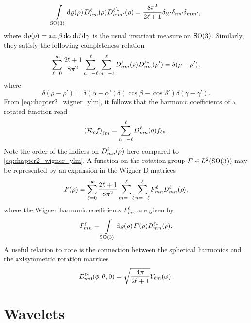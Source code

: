 %
\begin{equation}
	\integrateRotation{\rho} \wigner{\ell}{n}{m}(\rho) \wigner[\ast]{\ell'}{n'}{m'}(\rho)
	= \frac{8\pi^{2}}{2\ell+1} \delta_{\ell\ell'} \delta_{n n'} \delta_{mm'},
\end{equation}
%
where \(\rotationVolume = \sin{\beta}\dd{\alpha}\dd{\beta}\dd{\gamma}\) is the usual invariant measure on \(\rotationGroup{}\).
Similarly, they satisfy the following completeness relation
%
\begin{equation}
	\sum\limits_{\ell=0}^{\infty} \frac{2\ell+1}{8\pi^{2}} \wignerSum \sum\limits_{m=-\ell}^{\ell} \wigner{\ell}{n}{m}(\rho) \wigner[\ast]{\ell}{n}{m}(\rho')
	= \delta(\rho-\rho'),
\end{equation}
%
where
%
\begin{equation}
	\delta(\rho-\rho')
	= \delta(\alpha-\alpha') \delta(\cos{\beta} - \cos{\beta'}) \delta(\gamma-\gamma').
\end{equation}
%
From \cref{eq:chapter2_wigner_ylm}, it follows that the harmonic coefficients of a rotated function read
%
\begin{equation}
	\harmonic{(\rotation{\rho}f)}
	= \wignerSum \wigner{\ell}{m}{n}(\rho) f_{\ell n}.
\end{equation}
%
Note the order of the indices on \(\wigner{\ell}{m}{n}(\rho)\) here compared to \cref{eq:chapter2_wigner_ylm}.
A function on the rotation group \(F \in \hilbert{\rotationGroup}\) may be represented by an expansion in the Wigner D matrices
%
\begin{equation}
	F(\rho)
	= \sum\limits_{\ell=0}^{\infty} \frac{2\ell+1}{8\pi^{2}} \sum\limits_{m=-\ell}^{\ell} \wignerSum F^{\ell}_{m n} \wigner{\ell}{m}{n}(\rho),
\end{equation}
%
where the Wigner harmonic coefficients \(F^{\ell}_{m n}\) are given by
%
\begin{equation}
	F^{\ell}_{m n}
	= \integrateRotation{\rho} F(\rho) \wigner[\ast]{\ell}{m}{n}(\rho).
\end{equation}
%
A useful relation to note is the connection between the spherical harmonics and the axisymmetric rotation matrices
%
\begin{equation}
	\wigner[\ast]{\ell}{m}{0}(\phi,\theta,0)
	= \sqrt{\inverseFactor} \pixel{\harmonic{Y}}.
\end{equation}

\section{Wavelets}\label{sec:chapter2_wavelets}

